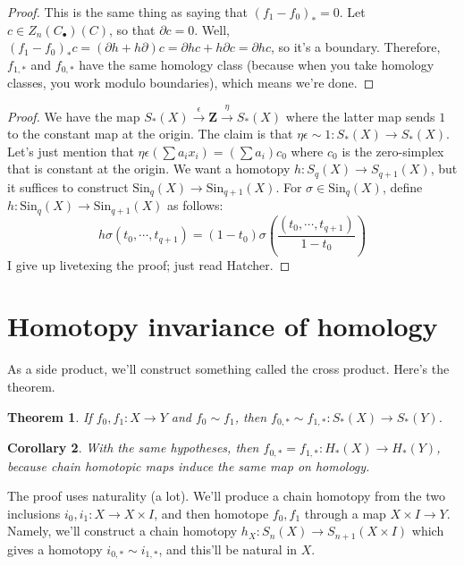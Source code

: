 \documentclass{amsart}
\theoremstyle{theorem}
\newtheorem{theorem}{Theorem}[section]
\newtheorem{corollary}[theorem]{Corollary}
\theoremstyle{definition}
\newcommand{\Sin}{\mathrm{Sin}}
\begin{document}
		\begin{proof}
		This is the same thing as saying that $(f_1-f_0)_\ast=0$. Let $c\in Z_n(C_\bullet)(C)$, so that $\partial c=0$. Well, $(f_1-f_0)_\ast c=(\partial h+h\partial)c=\partial hc+h\partial c=\partial hc$, so it's a boundary. Therefore, $f_{1,\ast}$ and $f_{0,\ast}$ have the same homology class (because when you take homology classes, you work modulo boundaries), which means we're done.
		\end{proof}
		\begin{proof}
		We have the map $S_\ast(X)\xrightarrow{\epsilon}\mathbf{Z}\xrightarrow{\eta}S_\ast(X)$ where the latter map sends $1$ to the constant map at the origin. The claim is that $\eta\epsilon\sim 1:S_\ast(X)\to S_\ast(X)$. Let's just mention that $\eta\epsilon(\sum a_ix_i)=(\sum a_i)c_0$ where $c_0$ is the zero-simplex that is constant at the origin. We want a homotopy $h:S_q(X)\to S_{q+1}(X)$, but it suffices to construct $\Sin_q(X)\to \Sin_{q+1}(X)$. For $\sigma\in\Sin_q(X)$, define $h:\Sin_q(X)\to\Sin_{q+1}(X)$ as follows:
		$$h\sigma(t_0,\cdots,t_{q+1})=(1-t_0)\sigma\left(\frac{(t_0,\cdots,t_{q+1})}{1-t_0}\right)$$
		I give up livetexing the proof; just read Hatcher.
		\end{proof}
\section{Homotopy invariance of homology}
As a side product, we'll construct something called the cross product. Here's the theorem.
	\begin{theorem}
	If $f_0,f_1:X\to Y$ and $f_0\sim f_1$, then $f_{0,\ast}\sim f_{1,\ast}:S_\ast(X)\to S_\ast(Y)$.
	\end{theorem}
	\begin{corollary}
	With the same hypotheses, then $f_{0,\ast}=f_{1,\ast}: H_\ast(X)\to H_\ast(Y)$, because chain homotopic maps induce the same map on homology.
	\end{corollary}
The proof uses naturality (a lot). We'll produce a chain homotopy from the two inclusions $i_0,i_1:X\to X\times I$, and then homotope $f_0,f_1$ through a map $X\times I\to Y$. Namely, we'll construct a chain homotopy $h_X:S_n(X)\to S_{n+1}(X\times I)$ which gives a homotopy $i_{0,\ast}\sim i_{1,\ast}$, and this'll be natural in $X$.
\end{document}
